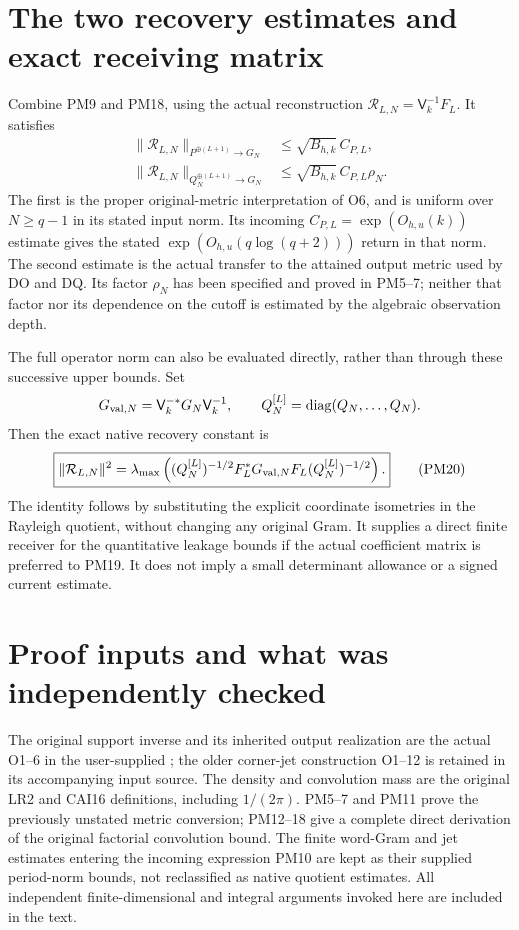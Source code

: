 \section{The two recovery estimates and exact receiving matrix}
Combine PM9 and PM18, using the actual reconstruction
$\mathcal R_{L,N}=\mathsf V_k^{-1}F_L$.  It satisfies
\[
 \begin{split}
 \|\mathcal R_{L,N}\|_{P^{\oplus(L+1)}\to G_N}
      &\le\sqrt{B_{h,k}}\,C_{P,L},\\
 \|\mathcal R_{L,N}\|_{Q_N^{\oplus(L+1)}\to G_N}
      &\le\sqrt{B_{h,k}}\,C_{P,L}\rho_N.
 \end{split}                                                     \tag{PM19}
\]
The first is the proper original-metric interpretation of O6,
and is uniform over $N\ge q-1$ in its stated input norm.  Its
incoming $C_{P,L}=\exp(O_{h,u}(k))$ estimate gives the stated
$\exp(O_{h,u}(q\log(q+2)))$ return in that norm.  The second
estimate is the actual transfer to the attained output metric
used by DO and DQ.  Its factor $\rho_N$ has been specified and
proved in PM5--7; neither that factor nor its dependence on the
cutoff is estimated by the algebraic observation depth.

The full operator norm can also be evaluated directly, rather
than through these successive upper bounds.  Set
\[
 G_{{\rm val},N}=\mathsf V_k^{-*}G_N\mathsf V_k^{-1},\qquad
 Q_N^{[L]}=\operatorname{diag}(Q_N,\ldots,Q_N).
\]
Then the exact native recovery constant is
\[
 \boxed{\|\mathcal R_{L,N}\|^2
 =\lambda_{\max}\left((Q_N^{[L]})^{-1/2}
          F_L^*G_{{\rm val},N}F_L(Q_N^{[L]})^{-1/2}\right).}     \tag{PM20}
\]
The identity follows by substituting the explicit coordinate
isometries in the Rayleigh quotient, without changing any
original Gram.  It supplies a direct finite receiver for the
quantitative leakage bounds if the actual coefficient matrix
is preferred to PM19.  It does not imply a small determinant
allowance or a signed current estimate.

\section{Proof inputs and what was independently checked}
The original support inverse and its inherited output realization
are the actual O1--6 in the user-supplied
;
the older corner-jet construction O1--12 is retained in its
accompanying input source.  The density and convolution mass
are the original LR2 and CAI16 definitions, including $1/(2\pi)$.
PM5--7 and PM11 prove the previously unstated metric conversion;
PM12--18 give a complete direct derivation of the original
factorial convolution bound.  The finite word-Gram and jet
estimates entering the incoming expression PM10 are kept as
their supplied period-norm bounds, not reclassified as native
quotient estimates.  All independent finite-dimensional and
integral arguments invoked here are included in the text.

